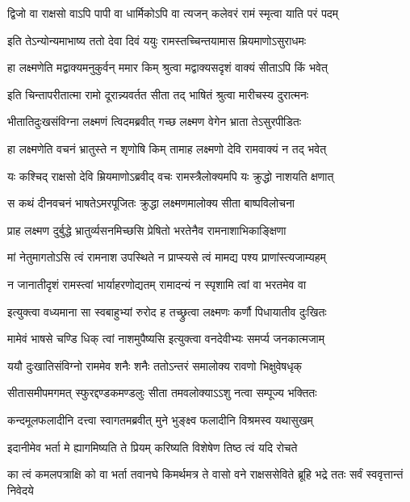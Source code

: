 \twolineshloka
{द्विजो वा राक्षसो वाऽपि पापी वा धार्मिकोऽपि वा}
{त्यजन् कलेवरं रामं स्मृत्वा याति परं पदम्} %

\twolineshloka
{इति तेऽन्योन्यमाभाष्य ततो देवा दिवं ययुः}
{रामस्तच्चिन्तयामास म्रियमाणोऽसुराधमः} %

\twolineshloka
{हा लक्ष्मणेति मद्वाक्यमनुकुर्वन् ममार किम्}
{श्रुत्वा मद्वाक्यसदृशं वाक्यं सीताऽपि किं भवेत्} %

\twolineshloka
{इति चिन्तापरीतात्मा रामो दूरान्न्यवर्तत}
{सीता तद् भाषितं श्रुत्वा मारीचस्य दुरात्मनः} %

\twolineshloka
{भीतातिदुःखसंविग्ना लक्ष्मणं त्विदमब्रवीत्}
{गच्छ लक्ष्मण वेगेन भ्राता तेऽसुरपीडितः} %

\twolineshloka
{हा लक्ष्मणेति वचनं भ्रातुस्ते न शृणोषि किम्}
{तामाह लक्ष्मणो देवि रामवाक्यं न तद् भवेत्} %

\twolineshloka
{यः कश्चिद् राक्षसो देवि म्रियमाणोऽब्रवीद् वचः}
{रामस्त्रैलोक्यमपि यः क्रुद्धो नाशयति क्षणात्} %

\twolineshloka
{स कथं दीनवचनं भाषतेऽमरपूजितः}
{क्रुद्धा लक्ष्मणमालोक्य सीता बाष्पविलोचना} %

\twolineshloka
{प्राह लक्ष्मण दुर्बुद्धे भ्रातुर्व्यसनमिच्छसि}
{प्रेषितो भरतेनैव रामनाशाभिकाङ्क्षिणा} %

\twolineshloka
{मां नेतुमागतोऽसि त्वं रामनाश उपस्थिते}
{न प्राप्स्यसे त्वं मामद्य पश्य प्राणांस्त्यजाम्यहम्} %

\twolineshloka
{न जानातीदृशं रामस्त्वां भार्याहरणोद्यतम्}
{रामादन्यं न स्पृशामि त्वां वा भरतमेव वा} %

\twolineshloka
{इत्युक्त्वा वध्यमाना सा स्वबाहुभ्यां रुरोद ह}
{तच्छ्रुत्वा लक्ष्मणः कर्णौ पिधायातीव दुःखितः} %

\twolineshloka
{मामेवं भाषसे चण्डि धिक् त्वां नाशमुपैष्यसि}
{इत्युक्त्वा वनदेवीभ्यः समर्प्य जनकात्मजाम्} %

\twolineshloka
{ययौ दुःखातिसंविग्नो राममेव शनैः शनैः}
{ततोऽन्तरं समालोक्य रावणो भिक्षुवेषधृक्} %

\twolineshloka
{सीतासमीपमगमत् स्फुरद्दण्डकमण्डलुः}
{सीता तमवलोक्याऽऽशु नत्वा सम्पूज्य भक्तितः} %

\twolineshloka
{कन्दमूलफलादीनि दत्त्वा स्वागतमब्रवीत्}
{मुने भुङ्क्ष्व फलादीनि विश्रमस्व यथासुखम्} %

\twolineshloka
{इदानीमेव भर्ता मे ह्यागमिष्यति ते प्रियम्}
{करिष्यति विशेषेण तिष्ठ त्वं यदि रोचते} %


\threelineshloka
{का त्वं कमलपत्राक्षि को वा भर्ता तवानघे}
{किमर्थमत्र ते वासो वने राक्षससेविते}
{ब्रूहि भद्रे ततः सर्वं स्ववृत्तान्तं निवेदये} %

